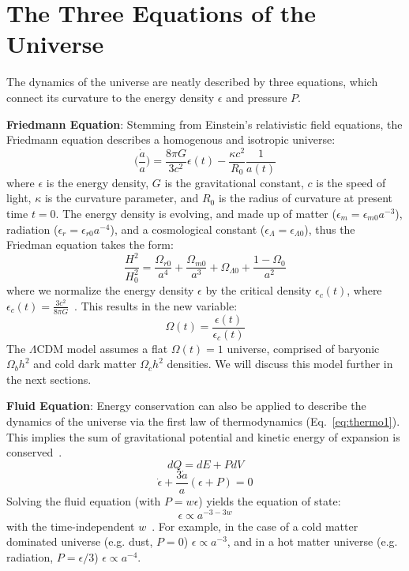 \section{The Three Equations of the Universe}

The dynamics of the universe are neatly described by three equations, which connect its curvature to the energy density $\epsilon$ and pressure $P$.

\noindent
\textbf{Friedmann Equation}:  Stemming from Einstein's relativistic field equations, the Friedmann equation describes a homogenous and isotropic universe:  
\begin{equation}
    \bigg ( \frac{\Dot{a}}{a} \bigg ) = \frac{8\pi G}{3c^2}\epsilon(t) - \frac{\kappa c^2}{R_0}\frac{1}{a(t)}
\end{equation}
where $\epsilon$ is the energy density, $G$ is the gravitational constant, $c$ is the speed of light, $\kappa$ is the curvature parameter, and $R_0$ is the radius of curvature at present time $t=0$.  The energy density is evolving, and made up of matter ($\epsilon_m=\epsilon_{m0}a^{-3}$), radiation ($\epsilon_r=\epsilon_{r0}a^{-4}$), and a cosmological constant ($\epsilon_{\Lambda}=\epsilon_{\Lambda 0}$), thus the Friedman equation takes the form:
\begin{equation}
    \frac{H^2}{H_0^2} = \frac{\Omega_{r0}}{a^4} + \frac{\Omega_{m0}}{a^3} + \Omega_{\Lambda 0} + \frac{1-\Omega_0}{a^2}
\end{equation}
where we normalize the energy density $\epsilon$ by the critical density $\epsilon_c(t)$, where $\epsilon_c(t) = \frac{3c^2}{8\pi G}$~\cite{ryden_2016}.  This results in the new variable:
\begin{equation}
    \Omega(t) = \frac{\epsilon(t)}{\epsilon_c(t)}
\end{equation}
The $\Lambda$CDM model assumes a flat $\Omega(t)=1$ universe, comprised of baryonic $\Omega_b h^2$ and cold dark matter $\Omega_c h^2$ densities.  We will discuss this model further in the next sections.

\noindent
\textbf{Fluid Equation}:  Energy conservation can also be applied to describe the dynamics of the universe via the first law of thermodynamics (Eq.~\ref{eq:thermo1}).  This implies the sum of gravitational potential and kinetic energy of expansion is conserved~\cite{ryden_2016}.
\begin{equation}
    dQ = dE + PdV
    \label{eq:thermo1}
\end{equation}
\begin{equation}
    \dot{\epsilon} + \frac{3\dot{a}}{a}(\epsilon + P) = 0
    \label{eq:fluid_universe}
\end{equation}
\noindent
Solving the fluid equation (with $P=w\epsilon$) yields the equation of state:
\begin{equation}
    \epsilon \propto a^{-3-3w}
\end{equation}
with the time-independent $w$~\cite{weinberg_cosmo}.  For example, in the case of a cold matter dominated universe (e.g. dust, $P = 0$) $\epsilon\propto a^{-3}$, and in a hot matter universe (e.g. radiation, $P=\epsilon/3$) $\epsilon\propto a^{-4}$.

